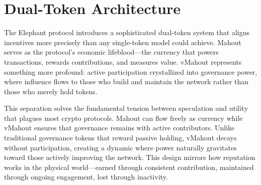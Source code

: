 \section{Dual-Token Architecture}

The Elephant protocol introduces a sophisticated dual-token system that aligns incentives more precisely than any single-token model could achieve. Mahout serves as the protocol's economic lifeblood---the currency that powers transactions, rewards contributions, and measures value. vMahout represents something more profound: active participation crystallized into governance power, where influence flows to those who build and maintain the network rather than those who merely hold tokens.

This separation solves the fundamental tension between speculation and utility that plagues most crypto protocols. Mahout can flow freely as currency while vMahout ensures that governance remains with active contributors. Unlike traditional governance tokens that reward passive holding, vMahout decays without participation, creating a dynamic where power naturally gravitates toward those actively improving the network. This design mirrors how reputation works in the physical world---earned through consistent contribution, maintained through ongoing engagement, lost through inactivity.

